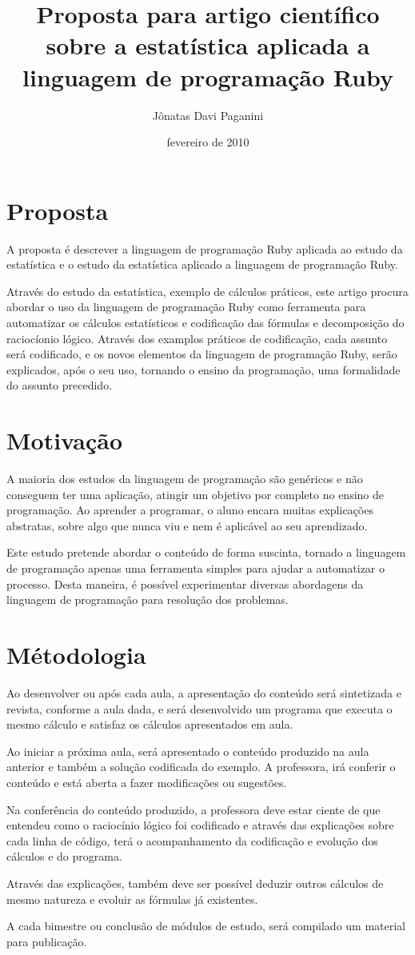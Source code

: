 \documentclass[espaco=simples,appendix=Name]{abnt}
\title{Proposta para artigo científico sobre a estatística aplicada a linguagem de programação Ruby}
\author{Jônatas Davi Paganini}
\date{fevereiro de 2010}
\begin{document}
\maketitle

\chapter{Proposta}

A proposta é descrever a linguagem de programação Ruby aplicada ao estudo da estatística e o estudo da estatística aplicado a linguagem de programação Ruby. 

Através do estudo da estatística, exemplo de cálculos práticos, este artigo procura abordar o uso da linguagem de programação Ruby como ferramenta para automatizar os cálculos estatísticos e codificação das fórmulas e decomposição do raciocíonio lógico. Através dos examplos práticos de codificação, cada assunto será codificado, e os novos elementos da linguagem de programação Ruby, serão explicados, após o seu uso, tornando o ensino da programação, uma formalidade do assunto precedido.


\chapter{Motivação}

A maioria dos estudos da linguagem de programação são genéricos e não conseguem ter uma aplicação, atingir um objetivo por completo no ensino de programação. Ao aprender a programar,  o aluno encara muitas explicações abstratas, sobre algo que nunca viu e nem é aplicável ao seu aprendizado.

Este estudo pretende abordar o conteúdo de forma suscinta, tornado a linguagem de programação apenas uma ferramenta simples para ajudar a automatizar o processo. Desta maneira, é possível experimentar diversas abordagens da linguagem de programação para resolução dos problemas.  


\chapter{Métodologia}

Ao desenvolver ou após cada aula, a apresentação do conteúdo será sintetizada e revista, conforme a aula dada, e será desenvolvido um programa que executa o mesmo cálculo e satisfaz os cálculos apresentados em aula.

Ao iniciar a próxima aula, será apresentado o conteúdo produzido na aula anterior e também a solução codificada do exemplo. A professora, irá conferir o conteúdo e está aberta a fazer modificações ou sugestões. 

Na conferência do conteúdo produzido, a professora deve estar ciente de que entendeu como o raciocínio lógico foi codificado e através das explicações sobre cada linha de código, terá o acompanhamento da codificação e evolução dos cálculos e do programa. 

Através das explicações, também deve ser possível deduzir outros cálculos de mesmo natureza e evoluir as fórmulas já existentes.

A cada bimestre ou conclusão de módulos de estudo, será compilado um material para publicação.
\end{document}
